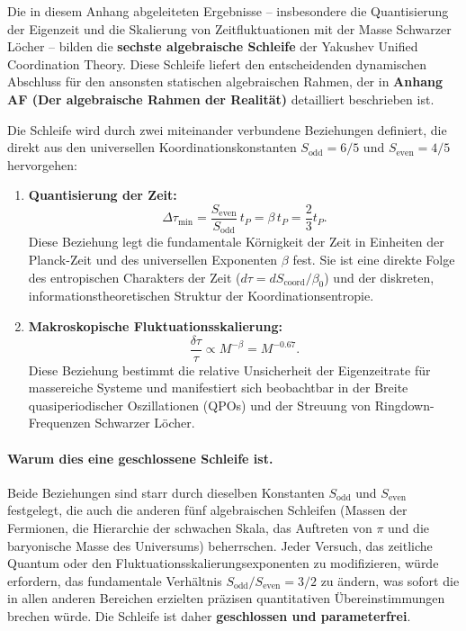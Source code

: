 \documentclass[12pt,a4paper]{article}
\begin{document}
	Die in diesem Anhang abgeleiteten Ergebnisse – insbesondere die Quantisierung der Eigenzeit und die Skalierung von Zeitfluktuationen mit der Masse Schwarzer Löcher – bilden die \textbf{sechste algebraische Schleife} der Yakushev Unified Coordination Theory. Diese Schleife liefert den entscheidenden dynamischen Abschluss für den ansonsten statischen algebraischen Rahmen, der in \textbf{Anhang AF (Der algebraische Rahmen der Realität)} detailliert beschrieben ist.
	
	Die Schleife wird durch zwei miteinander verbundene Beziehungen definiert, die direkt aus den universellen Koordinationskonstanten \(S_{\mathrm{odd}} = 6/5\) und \(S_{\mathrm{even}} = 4/5\) hervorgehen:
	
	\begin{enumerate}
		\item \textbf{Quantisierung der Zeit:}
		\begin{equation}
			\Delta \tau_{\min} = \frac{S_{\mathrm{even}}}{S_{\mathrm{odd}}} \, t_P = \beta \, t_P = \frac{2}{3} t_P.
			\label{eq:loop6-quantization}
		\end{equation}
		Diese Beziehung legt die fundamentale Körnigkeit der Zeit in Einheiten der Planck-Zeit und des universellen Exponenten \(\beta\) fest. Sie ist eine direkte Folge des entropischen Charakters der Zeit (\(d\tau = dS_{\mathrm{coord}} / \beta_0\)) und der diskreten, informationstheoretischen Struktur der Koordinationsentropie.
		
		\item \textbf{Makroskopische Fluktuationsskalierung:}
		\begin{equation}
			\frac{\delta \tau}{\tau} \propto M^{-\beta} = M^{-0.67}.
			\label{eq:loop6-fluctuation}
		\end{equation}
		Diese Beziehung bestimmt die relative Unsicherheit der Eigenzeitrate für massereiche Systeme und manifestiert sich beobachtbar in der Breite quasiperiodischer Oszillationen (QPOs) und der Streuung von Ringdown-Frequenzen Schwarzer Löcher.
	\end{enumerate}
	
	\paragraph{Warum dies eine geschlossene Schleife ist.}
	Beide Beziehungen sind starr durch dieselben Konstanten \(S_{\mathrm{odd}}\) und \(S_{\mathrm{even}}\) festgelegt, die auch die anderen fünf algebraischen Schleifen (Massen der Fermionen, die Hierarchie der schwachen Skala, das Auftreten von \(\pi\) und die baryonische Masse des Universums) beherrschen. Jeder Versuch, das zeitliche Quantum oder den Fluktuationsskalierungsexponenten zu modifizieren, würde erfordern, das fundamentale Verhältnis \(S_{\mathrm{odd}}/S_{\mathrm{even}} = 3/2\) zu ändern, was sofort die in allen anderen Bereichen erzielten präzisen quantitativen Übereinstimmungen brechen würde. Die Schleife ist daher \textbf{geschlossen und parameterfrei}.
	
\end{document}
